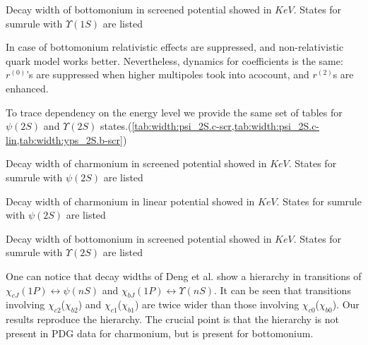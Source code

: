 \begin{table}[H]
    \centering
    \caption{Decay width of bottomonium in screened potential showed in $KeV$. States for sumrule with $\Upsilon(1S)$ are listed \label{tab:width:yps_1S.b-scr}}
    \begin{small}
        
    \end{small}
\end{table}

In case of bottomonium relativistic effects are suppressed, and non-relativistic quark model works better. Nevertheless, dynamics for coefficients is the same: $r^{(0)}$'s are suppressed when higher multipoles took into acocount, and $r^{(2)}$s are enhanced.

To trace dependency on the energy level we provide the same set of tables for $\psi(2S)$ and $\Upsilon(2S)$ states.(\cref{tab:width:psi_2S.c-scr,tab:width:psi_2S.c-lin,tab:width:yps_2S.b-scr})

\begin{table}[H]
    \centering
    \caption{Decay width of charmonium in screened potential showed in $KeV$. States for sumrule with $\psi(2S)$ are listed \label{tab:width:psi_2S.c-scr}}
    \begin{small}
        
    \end{small}
\end{table}

\begin{table}[H]
    \centering
    \caption{Decay width of charmonium in linear potential showed in $KeV$. States for sumrule with $\psi(2S)$ are listed \label{tab:width:psi_2S.c-lin}}
    \begin{small}
        
    \end{small}
\end{table}

\begin{table}[H]
    \centering
    \caption{Decay width of bottomonium in screened potential showed in $KeV$. States for sumrule with $\Upsilon(2S)$ are listed \label{tab:width:yps_2S.b-scr}}
    \begin{small}
        
    \end{small}
\end{table}

One can notice that decay widths of Deng et al. show a hierarchy in transitions of $\chi_{cJ}(1P) \leftrightarrow \psi(nS)$ and $\chi_{bJ}(1P) \leftrightarrow \Upsilon(nS)$. It can be seen that transitions involving $\chi_{c2}$($\chi_{b2}$) and $\chi_{c1}$($\chi_{b1}$) are twice wider than those involving $\chi_{c0}$($\chi_{b0}$). Our results reproduce the hierarchy. The crucial point is that the hierarchy is not present in PDG data for charmonium, but is present for bottomonium.

